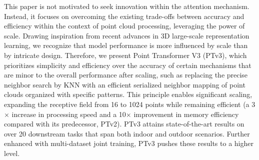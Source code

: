 This paper is not motivated to seek innovation within the attention mechanism. Instead, it focuses on overcoming the existing trade-offs between accuracy and efficiency within the context of point cloud processing, leveraging the power of scale. Drawing inspiration from recent advances in 3D large-scale representation learning, we recognize that model performance is more influenced by scale than by intricate design. Therefore, we present Point Transformer V3 (PTv3), which prioritizes simplicity and efficiency over the accuracy of certain mechanisms that are minor to the overall performance after scaling, such as replacing the precise neighbor search by KNN with an efficient serialized neighbor mapping of point clouds organized with specific patterns. This principle enables significant scaling, expanding the receptive field from 16 to 1024 points while remaining efficient (a 3$\times$ increase in processing speed and a 10$\times$ improvement in memory efficiency compared with its predecessor, PTv2). PTv3 attains state-of-the-art results on over 20 downstream tasks that span both indoor and outdoor scenarios. Further enhanced with multi-dataset joint training, PTv3 pushes these results to a higher level. 
